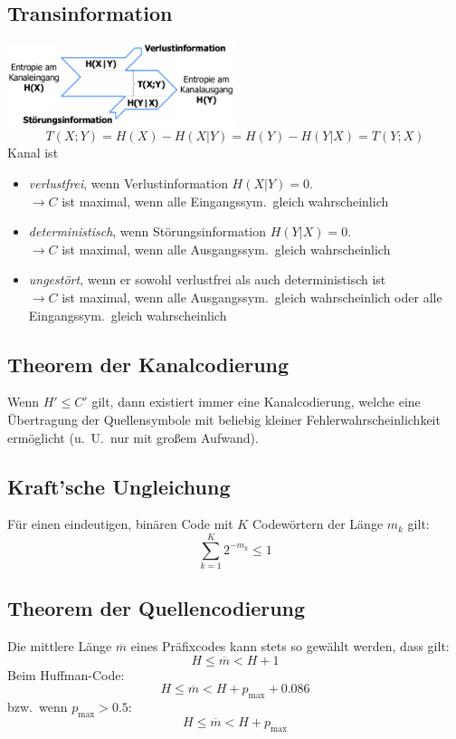 \subsection*{Transinformation}
\includegraphics[width=0.5\textwidth]{transinformation}
\[
    T(X; Y) = H(X) - H(X | Y) = H(Y) - H(Y | X) = T(Y; X)
\]
Kanal ist 
\begin{itemize}
    \setlength{\parskip}{0pt}
    \setlength{\itemsep}{0pt plus 1pt}
    \item \textit{verlustfrei}, wenn Verlustinformation $ H(X | Y) = 0. $ \\
        $ \rightarrow C $ ist maximal, wenn alle Eingangssym.\ gleich
        wahrscheinlich
    \item \textit{deterministisch}, wenn Störungsinformation $ H(Y | X) = 0. $ \\
        $ \rightarrow C $ ist maximal, wenn alle Ausgangssym.\ gleich
        wahrscheinlich
    \item \textit{ungestört}, wenn er sowohl verlustfrei als auch
        deterministisch ist \\
        $ \rightarrow C $ ist maximal, wenn alle Ausgangssym.\ gleich
        wahrscheinlich oder alle Eingangssym.\ gleich wahrscheinlich
\end{itemize}

\subsection*{Theorem der Kanalcodierung}
Wenn $ H' \leq C' $ gilt, dann existiert immer eine Kanalcodierung, welche eine
Übertragung der Quellensymbole mit beliebig kleiner Fehlerwahrscheinlichkeit
ermöglicht (u.\ U.\ nur mit großem Aufwand).

\subsection*{Kraft'sche Ungleichung}
Für einen eindeutigen, binären Code mit $ K $ Codewörtern der Länge $ m_k $ gilt:
\[
    \sum_{k=1}^{K} 2^{-m_k} \le 1
\]

\subsection*{Theorem der Quellencodierung}
Die mittlere Länge $ \overline{m} $ eines Präfixcodes kann stets so gewählt
werden, dass gilt:
\[
    H \leq \overline{m} < H + 1
\]
Beim Huffman-Code:
\[
    H \leq \overline{m} < H + p_{\max} + 0.086
\]
bzw.\ wenn $ p_{\max} > 0.5 $:
\[
    H \leq \overline{m} < H + p_{\max}
\]

